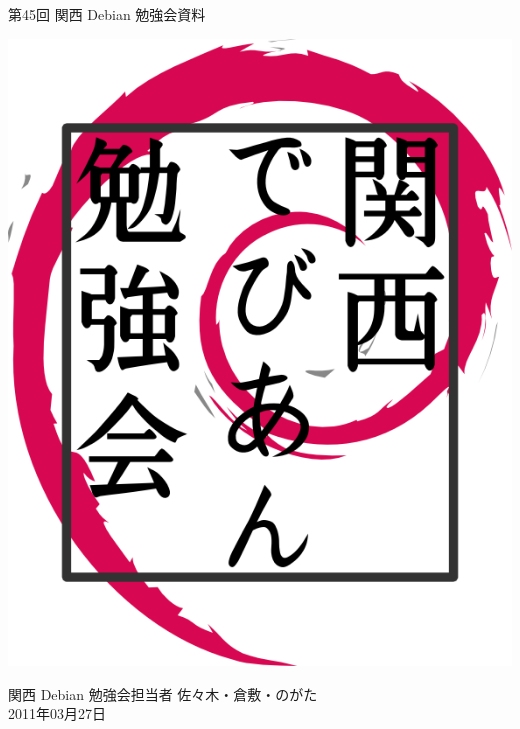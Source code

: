 \documentclass[mingoth,a4paper]{jsarticle}
\newcommand{\debmtgyear}{2011}
\newcommand{\debmtgdate}{27}
\newcommand{\debmtgmonth}{03}
\newcommand{\debmtgnumber}{45}
\begin{document}
\begin{titlepage}


 第\debmtgnumber{}回 関西 Debian 勉強会資料

\vspace{2cm}

\begin{center}
\includegraphics{image200802/kansaidebianlogo.png}
\end{center}

\begin{flushright}
\hfill{}関西 Debian 勉強会担当者 佐々木・倉敷・のがた \\
\hfill{}\debmtgyear{}年\debmtgmonth{}月\debmtgdate{}日
\end{flushright}

\thispagestyle{empty}
\end{titlepage}


\subsection*{}%
\end{document}

